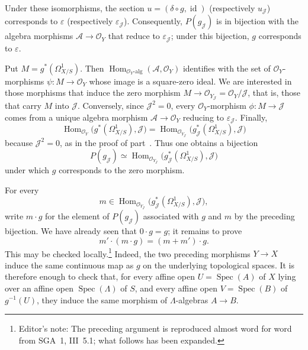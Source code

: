 Under these isomorphisms, the section
\(u=(\delta\circ g,\operatorname{id})\) (respectively
\(u_{\mathscr J}\)) corresponds to \(\varepsilon\) (respectively
\(\varepsilon_{\mathscr J}\)). Consequently,
\(P(g_{\mathscr J})\) is in bijection with the algebra morphisms
\(\mathscr A\to\mathscr O_Y\) that reduce to
\(\varepsilon_{\mathscr J}\); under this bijection, \(g\) corresponds
to \(\varepsilon\).

Put \(M=g^*(\Omega^1_{X/S})\). Then
\(\operatorname{Hom}_{\mathscr O_Y\text{-}\mathrm{alg}}
 (\mathscr A,\mathscr O_Y)\) identifies with the set of
\(\mathscr O_Y\)-morphisms \(\psi:M\to\mathscr O_Y\) whose image is a
square-zero ideal. We are interested in those morphisms that induce the
zero morphism
\(M\to\mathscr O_{Y_{\mathscr J}}=\mathscr O_Y/\mathscr J\), that is,
those that carry \(M\) into \(\mathscr J\). Conversely, since
\(\mathscr J^2=0\), every \(\mathscr O_Y\)-morphism
\(\phi:M\to\mathscr J\) comes from a unique algebra morphism
\(\mathscr A\to\mathscr O_Y\) reducing to
\(\varepsilon_{\mathscr J}\). Finally,
\[
 \operatorname{Hom}_{\mathscr O_Y}
   \bigl(g^*(\Omega^1_{X/S}),\mathscr J\bigr)
 =
 \operatorname{Hom}_{\mathscr O_{Y_{\mathscr J}}}
   \bigl(g_{\mathscr J}^*(\Omega^1_{X/S}),\mathscr J\bigr)
\]
because \(\mathscr J^2=0\), as in the proof of part~. Thus one
obtains a bijection
\[
 P(g_{\mathscr J})\simeq
 \operatorname{Hom}_{\mathscr O_{Y_{\mathscr J}}}
 \bigl(g_{\mathscr J}^*(\Omega^1_{X/S}),\mathscr J\bigr)
\]
under which \(g\) corresponds to the zero morphism.

For every
\[
 m\in
 \operatorname{Hom}_{\mathscr O_{Y_{\mathscr J}}}
 \bigl(g_{\mathscr J}^*(\Omega^1_{X/S}),\mathscr J\bigr),
\]
write \(m\cdot g\) for the element of \(P(g_{\mathscr J})\) associated
with \(g\) and \(m\) by the preceding bijection. We have already seen
that \(0\cdot g=g\); it remains to prove
\begin{equation}
 m'\cdot(m\cdot g)=(m+m')\cdot g.
 \tag{0.1.8\,(*)}\label{sga3:iii:theorem:0-1-8:equation:0-1-8-star}
\end{equation}
This may be checked locally.\footnote{Editor's note: The preceding
argument is reproduced almost word for word from SGA~1, III~5.1; what
follows has been expanded.} Indeed, the two preceding morphisms
\(Y\to X\) induce the same continuous map as \(g\) on the underlying
topological spaces. It is therefore enough to check that, for every
affine open \(U=\operatorname{Spec}(A)\) of \(X\) lying over an affine
open \(\operatorname{Spec}(\Lambda)\) of \(S\), and every affine open
\(V=\operatorname{Spec}(B)\) of \(g^{-1}(U)\), they induce the same
morphism of \(\Lambda\)-algebras \(A\to B\).

